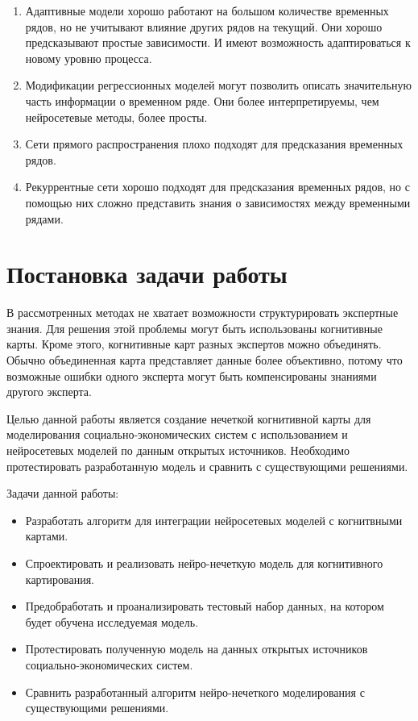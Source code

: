 \begin{enumerate}
	\item Адаптивные модели хорошо работают на большом количестве временных рядов,
	но не учитывают влияние других рядов на текущий. Они хорошо предсказывают простые зависимости.
	И имеют возможность адаптироваться к новому уровню процесса.
	\item Модификации регрессионных моделей могут позволить описать значительную
	часть информации о временном ряде. Они более интерпретируемы, чем нейросетевые методы, более просты.
	\item Сети прямого распространения плохо подходят для предсказания временных рядов.
	\item Рекуррентные сети хорошо подходят для предсказания временных рядов, но
	с помощью них сложно представить знания о зависимостях между временными рядами.
\end{enumerate}


\section{Постановка задачи работы}

В рассмотренных методах не хватает возможности структурировать экспертные знания.
Для решения этой проблемы могут быть использованы когнитивные карты.
Кроме этого, когнитивные карт разных экспертов можно объединять. Обычно
объединенная карта представляет данные более объективно, потому что возможные
ошибки одного эксперта могут быть компенсированы знаниями другого эксперта.

Целью данной работы является создание нечеткой когнитивной карты для моделирования
социально-экономических систем с использованием и нейросетевых моделей по данным открытых источников.
Необходимо протестировать разработанную модель и сравнить с существующими решениями.

Задачи данной работы:
\begin{itemize}
	\item Разработать алгоритм для интеграции нейросетевых моделей с когнитвными картами.
	\item Спроектировать и реализовать нейро-нечеткую модель для когнитивного картирования.
	\item Предобработать и проанализировать тестовый набор данных, на котором будет обучена исследуемая модель.
	\item Протестировать полученную модель на данных открытых источников социально-экономических систем.
	\item Сравнить разработанный алгоритм нейро-нечеткого моделирования с существующими решениями.
\end{itemize}


